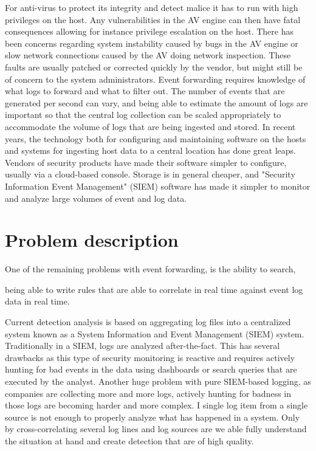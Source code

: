 For anti-virus to protect its integrity and detect malice it has to run with high privileges on the host. Any vulnerabilities in the AV engine can then have fatal consequences allowing for instance privilege escalation on the host. There has been concerns regarding system instability caused by bugs in the AV engine or slow network connections caused by the AV doing network inspection. These faults are usually patched or corrected quickly by the vendor, but might still be of concern to the system administrators. Event forwarding requires knowledge of what logs to forward and what to filter out. The number of events that are generated per second can vary, and being able to estimate the amount of logs are important so that the central log collection can be scaled appropriately to accommodate the volume of logs that are being ingested and stored.
In recent years, the technology both for configuring and maintaining software on the hosts and systems for ingesting host data to a central location has done great leaps. Vendors of security products have made their software simpler to configure, usually via a cloud-based console. Storage is in general cheaper, and "Security Information Event Management" (SIEM) software has made it simpler to monitor and analyze large volumes of event and log data.

\section{Problem description}
\label{sec:problemdescription}


One of the remaining problems with event forwarding, is the ability to search, 

being able to write rules that are able to correlate in real time against event log data in real time.

Current detection analysis is based on aggregating log files into a centralized system known as a System Information and Event Management (SIEM) system. Traditionally in a SIEM, logs are analyzed after-the-fact. This has several drawbacks as this type of security monitoring is reactive and requires actively hunting for bad events in the data using dashboards or search queries that are executed by the analyst.
Another huge problem with pure SIEM-based logging, as companies are collecting more and more logs, actively hunting for badness in those logs are becoming harder and more complex. I single log item from a single source is not enough to properly analyze what has happened in a system. Only by cross-correlating several log lines and log sources are we able fully understand the situation at hand and create detection that are of high quality.
